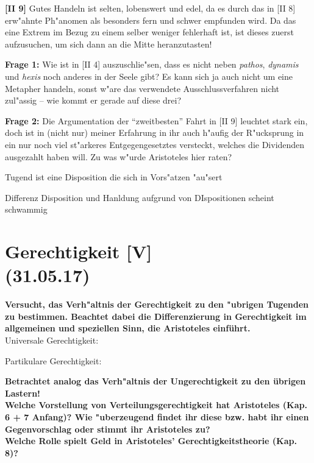 \documentclass[emulatestandardclasses]{scrartcl}
\begin{document}
\noindent \textbf{[II 9]} Gutes Handeln ist selten, lobenswert und edel, da es durch das in [II 8] erw"ahnte Ph"anomen als besonders fern und schwer empfunden wird. Da das eine Extrem im Bezug zu einem selber weniger fehlerhaft ist, ist dieses zuerst aufzusuchen, um sich dann an die Mitte heranzutasten!\newline


\noindent \textbf{Frage 1:} Wie ist in [II 4] auszuschlie"sen, dass es nicht neben \emph{pathos}, \emph{dynamis} und \emph{hexis} noch anderes in der Seele gibt? Es kann sich ja auch nicht um eine Metapher handeln, sonst w"are das verwendete Ausschlussverfahren nicht zul"assig -- wie kommt er gerade auf diese drei?\newline

\noindent \textbf{Frage 2:} Die Argumentation der "`zweitbesten"' Fahrt in [II 9] leuchtet stark ein, doch ist in (nicht nur) meiner Erfahrung in ihr auch h"aufig der R"ucksprung in ein nur noch viel st"arkeres Entgegengesetztes versteckt, welches die Dividenden ausgezahlt haben will. Zu was w"urde Aristoteles hier raten?

Tugend ist eine Disposition die sich in Vors"atzen "au"sert

Differenz Disposition und Hanldung aufgrund von DIspositionen scheint schwammig


\section{Gerechtigkeit [V]\\(31.05.17)}

\textbf{Versucht, das Verh"altnis der Gerechtigkeit zu den "ubrigen Tugenden zu bestimmen. Beachtet dabei die Differenzierung in Gerechtigkeit im allgemeinen und speziellen Sinn, die Aristoteles einführt.}\\

Universale Gerechtigkeit: 

Partikulare Gerechtigkeit: 

\noindent \textbf{Betrachtet analog das Verh"altnis der Ungerechtigkeit zu den übrigen Lastern!}\\

\noindent \textbf{Welche Vorstellung von Verteilungsgerechtigkeit hat Aristoteles (Kap. 6 + 7 Anfang)? Wie "uberzeugend findet ihr diese bzw. habt ihr einen Gegenvorschlag oder stimmt ihr Aristoteles zu?}\\

\noindent \textbf{Welche Rolle spielt Geld in Aristoteles' Gerechtigkeitstheorie (Kap. 8)?}\\
\end{document}
